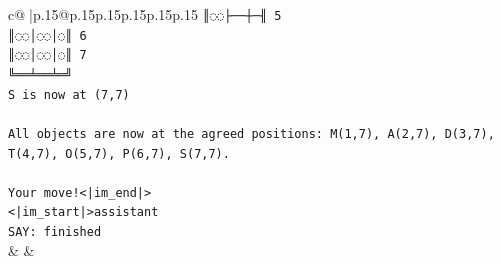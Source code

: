 \documentclass{article}
\begin{document}
{\begin{supertabular}{c@{$\;$}|p{.15\linewidth}@{}p{.15\linewidth}p{.15\linewidth}p{.15\linewidth}p{.15\linewidth}p{.15\linewidth}}
{{{\texttt{║◌◌├──┼─╢ 5} \\
\texttt{║◌◌│◌◌│◌║ 6} \\
\texttt{║◌◌│◌◌│◌║ 7} \\
\texttt{╚══╧══╧═╝} \\
\texttt{S is now at (7,7)} \\
\\ 
\texttt{All objects are now at the agreed positions: M(1,7), A(2,7), D(3,7), T(4,7), O(5,7), P(6,7), S(7,7).} \\
\\ 
\texttt{Your move!<|im\_end|>} \\
\texttt{<|im\_start|>assistant} \\
\texttt{SAY: finished} \\
            }
        }
    }
    & & \\ \\


\end{supertabular}}
\end{document}
